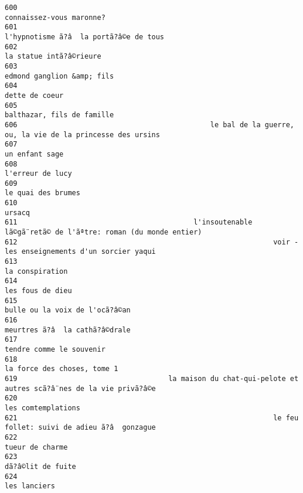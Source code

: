 \documentclass[
]{report}
\begin{document}
\begin{verbatim}
600                                                                                connaissez-vous maronne?
601                                                                  l'hypnotisme ã?â  la portã?â©e de tous
602                                                                                 la statue intã?â©rieure
603                                                                              edmond ganglion &amp; fils
604                                                                                          dette de coeur
605                                                                              balthazar, fils de famille
606                                              le bal de la guerre, ou, la vie de la princesse des ursins
607                                                                                          un enfant sage
608                                                                                        l'erreur de lucy
609                                                                                      le quai des brumes
610                                                                                                  ursacq
611                                          l'insoutenable lã©gã¨retã© de l'ãªtre: roman (du monde entier)
612                                                             voir - les enseignements d'un sorcier yaqui
613                                                                                         la conspiration
614                                                                                        les fous de dieu
615                                                                          bulle ou la voix de l'ocã?â©an
616                                                                          meurtres ã?â  la cathã?â©drale
617                                                                                tendre comme le souvenir
618                                                                             la force des choses, tome 1
619                                    la maison du chat-qui-pelote et autres scã?â¨nes de la vie privã?â©e
620                                                                                      les comtemplations
621                                                             le feu follet: suivi de adieu ã?â  gonzague
622                                                                                         tueur de charme
623                                                                                       dã?â©lit de fuite
624                                                                                            les lanciers

\end{verbatim}
\end{document}
